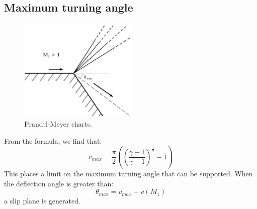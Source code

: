 \subsection{Maximum turning angle}
\begin{figure}[H]
    \centering
    \includegraphics[width = 0.5\textwidth]{./img/diagram27.png}
    \caption{Prandtl-Meyer charts.}
\end{figure}
From the formula, we find that:
\begin{equation}
    v_{max} = \frac{\pi}{2}\left(\left(\frac{\gamma + 1}{\gamma -1}\right)^{\frac{1}{2}} - 1\right)
\end{equation}
This places a limit on the maximum turning angle that can be supported. When the deflection angle is greater than:
\begin{equation}
    \theta_{max} = v_{max} - v\left(M_1\right)
\end{equation}
a slip plane is generated.
